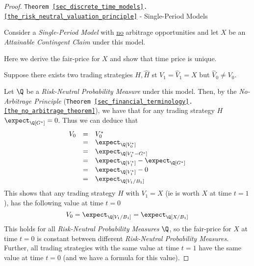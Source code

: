 \documentclass[11pt,a4paper]{article}
\begin{document}
  \begin{proof}{\texttt{Theorem \ref{sec_discrete_time_models}.\ref{the_risk_neutral_valuation_principle}} - Single-Period Models}\label{prf_risk_neutral_valuation_principle_single_period}
    \par Consider a \textit{Single-Period Model} with \underline{no} arbitrage opportunities and let $X$ be an \textit{Attainable Contingent Claim} under this model.
    \par Here we derive the fair-price for $X$ and show that time price is unique.
    \par Suppose there exists two trading strategies $H,\hat{H}$ st $V_1=\hat{V}_1=X$ but $\hat{V}_0\neq V_0$.
    \par Let $\Q$ be a \textit{Risk-Neutral Probability Measure} under this model. Then, by the \textit{No-Arbitrage Principle} (\texttt{Theorem \ref{sec_financial_terminology}.\ref{the_no_arbitrage_theorem}}), we have that for any trading strategy $H$ $\expect_\Q[G^*]=0$. Thus we can deduce that
    \[\begin{array}{rcl}
      V_0&=&V_0^*\\
      &=&\expect_\Q[V_0^*]\\
      &=&\expect_\Q[V_1^*-G^*]\\
      &=&\expect_\Q[V_1^*]-\expect_\Q[G^*]\\
      &=&\expect_\Q[V_1^*]-0\\
      &=&\expect_\Q[V_1/B_1]
    \end{array}\]
    This shows that any trading strategy $H$ with $V_1=X$ (ie is worth $X$ at time $t=1$), has the following value at time $t=0$
    \[ V_0=\expect_\Q[V_1/B_1]=\expect_\Q[X/B_1] \]
    This holds for all \textit{Risk-Neutral Probability Measures} $\Q$, so the fair-price for $X$ at time $t=0$ is constant between different \textit{Risk-Neutral Probability Measures}. Further, all trading strategies with the same value at time $t=1$ have the same value at time $t=0$ (and we have a formula for this value).\proved
  \end{proof}
\end{document}

